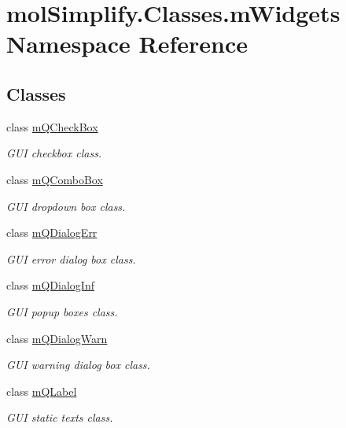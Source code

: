 \hypertarget{namespacemolSimplify_1_1Classes_1_1mWidgets}{}\section{mol\+Simplify.\+Classes.\+m\+Widgets Namespace Reference}
\label{namespacemolSimplify_1_1Classes_1_1mWidgets}
\subsection*{Classes}
\begin{DoxyCompactItemize}
\item 
class \hyperlink{classmolSimplify_1_1Classes_1_1mWidgets_1_1mQCheckBox}{m\+Q\+Check\+Box}
\begin{DoxyCompactList}\small\item\em G\+UI checkbox class. \end{DoxyCompactList}\item 
class \hyperlink{classmolSimplify_1_1Classes_1_1mWidgets_1_1mQComboBox}{m\+Q\+Combo\+Box}
\begin{DoxyCompactList}\small\item\em G\+UI dropdown box class. \end{DoxyCompactList}\item 
class \hyperlink{classmolSimplify_1_1Classes_1_1mWidgets_1_1mQDialogErr}{m\+Q\+Dialog\+Err}
\begin{DoxyCompactList}\small\item\em G\+UI error dialog box class. \end{DoxyCompactList}\item 
class \hyperlink{classmolSimplify_1_1Classes_1_1mWidgets_1_1mQDialogInf}{m\+Q\+Dialog\+Inf}
\begin{DoxyCompactList}\small\item\em G\+UI popup boxes class. \end{DoxyCompactList}\item 
class \hyperlink{classmolSimplify_1_1Classes_1_1mWidgets_1_1mQDialogWarn}{m\+Q\+Dialog\+Warn}
\begin{DoxyCompactList}\small\item\em G\+UI warning dialog box class. \end{DoxyCompactList}\item 
class \hyperlink{classmolSimplify_1_1Classes_1_1mWidgets_1_1mQLabel}{m\+Q\+Label}
\begin{DoxyCompactList}\small\item\em G\+UI static texts class. \end{DoxyCompactList}\item 

\end{DoxyCompactItemize}
